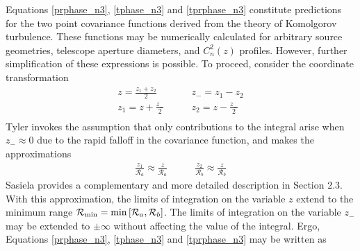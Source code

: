 Equations \ref{prphase_n3}, \ref{tphase_n3} and \ref{tprphase_n3}
constitute predictions for the two point covariance functions derived
from the theory of Komolgorov turbulence.  These functions may be
numerically calculated for arbitrary source geometries, telescope
aperture diameters, and $C_{n}^{2}(z)$ profiles.  However, further
simplification of these expressions is possible.  To proceed, consider
the coordinate transformation
\begin{equation}
\begin{aligned}
z = \frac{z_{1}+z_{2}}{2} \quad & \quad z_{-} = z_{1}-z_{2} \\
z_{1} = z+\frac{z_{-}}{2} \quad & \quad z_{2} = z-\frac{z_{-}}{2} \\
\end{aligned}
\end{equation}
Tyler invokes the assumption that only contributions to the integral
arise when $z_{-} \approx 0$ due to the rapid falloff in the
covariance function, and makes the approximations
\begin{equation}
\begin{aligned}
\frac{z_{1}}{\mathcal{R}_{a}} \approx \frac{z}{\mathcal{R}_{a}} \quad & \quad \frac{z_{2}}{\mathcal{R}_{b}} \approx \frac{z}{\mathcal{R}_{b}} 
\end{aligned}
\end{equation}
Sasiela\cite{sasiela2007electromagnetic} provides a complementary and
more detailed description in Section 2.3.  With this approximation,
the limits of integration on the variable $z$ extend to the minimum
range $\mathcal{R}_{\rm min} = {\rm min}\left[\mathcal{R}_{a},
  \mathcal{R}_{b}\right]$.  The limits of integration on the variable
$z_{-}$ may be extended to $\pm\infty$ without affecting the value of
the integral.  Ergo, Equations \ref{prphase_n3},
\ref{tphase_n3} and \ref{tprphase_n3} may be written as
